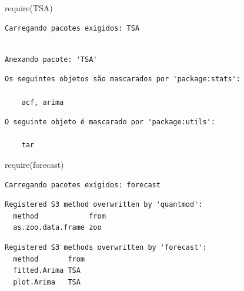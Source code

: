 \documentclass[
  letterpaper,
  DIV=11,
  numbers=noendperiod]{scrartcl}
\newenvironment{Shaded}{\begin{snugshade}}{\end{snugshade}}
\newcommand{\DecValTok}[1]{\textcolor[rgb]{0.68,0.00,0.00}{#1}}
\newcommand{\FunctionTok}[1]{\textcolor[rgb]{0.28,0.35,0.67}{#1}}
\newcommand{\NormalTok}[1]{\textcolor[rgb]{0.00,0.23,0.31}{#1}}
\newcommand{\OtherTok}[1]{\textcolor[rgb]{0.00,0.23,0.31}{#1}}
\newcommand{\SpecialCharTok}[1]{\textcolor[rgb]{0.37,0.37,0.37}{#1}}
\theoremstyle{definition}
\theoremstyle{definition}
\theoremstyle{plain}
\theoremstyle{plain}
\theoremstyle{remark}
\begin{document}
\begin{Shaded}
\begin{Highlighting}[]
\FunctionTok{require}\NormalTok{(TSA) }
\end{Highlighting}
\end{Shaded}

\begin{verbatim}
Carregando pacotes exigidos: TSA
\end{verbatim}

\begin{verbatim}

Anexando pacote: 'TSA'
\end{verbatim}

\begin{verbatim}
Os seguintes objetos são mascarados por 'package:stats':

    acf, arima
\end{verbatim}

\begin{verbatim}
O seguinte objeto é mascarado por 'package:utils':

    tar
\end{verbatim}

\begin{Shaded}
\begin{Highlighting}[]
\FunctionTok{require}\NormalTok{(forecast)}
\end{Highlighting}
\end{Shaded}

\begin{verbatim}
Carregando pacotes exigidos: forecast
\end{verbatim}

\begin{verbatim}
Registered S3 method overwritten by 'quantmod':
  method            from
  as.zoo.data.frame zoo 
\end{verbatim}

\begin{verbatim}
Registered S3 methods overwritten by 'forecast':
  method       from
  fitted.Arima TSA 
  plot.Arima   TSA 
\end{verbatim}

\begin{Shaded}
\end{Shaded}
\end{document}

